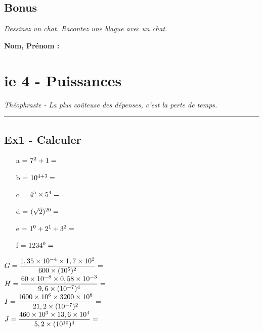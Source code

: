 \documentclass[12pt]{article}
\newcommand{\horrule}[1]{\rule{\linewidth}{#1}} %
\newcommand{\Pointilles}[1]{%
  \par\nobreak
  \noindent\rule{0pt}{1.5\baselineskip}%
  \multido{}{#1}{\noindent\makebox[\linewidth]{\dotfill}\endgraf}%
  \bigskip%
}
\begin{document}
\Pointilles{20}

\subsection*{Bonus}

\textit{Dessinez un chat. Racontez une blague avec un chat.}


%
%

\newpage

%
%
\textbf{Nom, Prénom : }

\section*{ie 4 - Puissances}
\begin{center}
  \textit{Théophraste - La plus coûteuse des dépenses, c’est la perte de temps.}
\end{center}
\horrule{2px}

\subsection*{Ex1 - Calculer}

\begin{multicols}{3}
  \begin{itemize}
  \item[a =] $7^2 + 1 =  \dotfill $
  \item[b =] $10^{4+3} =  \dotfill $
  \item[c =] $4^5 \times 5^4 =  \dotfill $
  \item[d =] $(\sqrt{2})^{20} =  \dotfill $
  \item[e =] $1^0 + 2^1 + 3^2 =  \dotfill $
  \item[f =] $1234^0 =  \dotfill $
  \end{itemize}

\end{multicols}

\begin{multicols}{2}

  $G = \dfrac{1,35 \times 10^{-4} \times 1,7 \times 10^{2}}{600 \times (10^5)^2} =  \dotfill $\\
  $H = \dfrac{60 \times 10^{-8} \times 0,58 \times 10^{-3}}{9,6 \times (10^{-7})^4} =  \dotfill $ \\
  $I = \dfrac{1600 \times 10^{6} \times 3200 \times 10^{8}}{21,2 \times (10^{-7})^2} =  \dotfill $\\
  $J = \dfrac{460 \times 10^{3} \times 13,6 \times 10^{4}}{5,2 \times (10^{10})^4} =  \dotfill $ 

\end{multicols}
\end{document}
